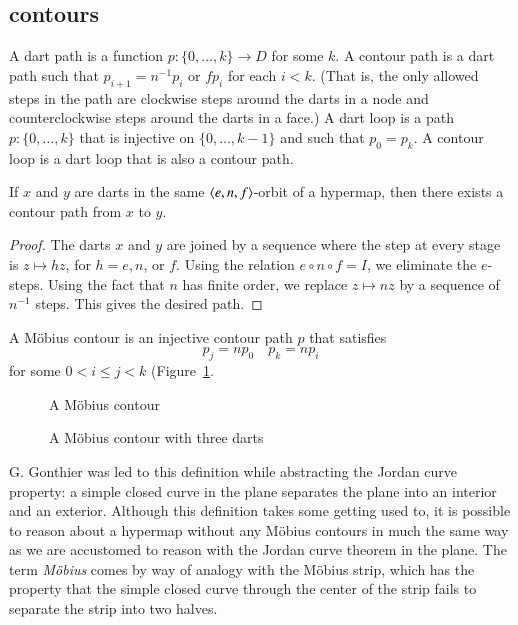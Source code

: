 \subsection{contours}

\begin{definition}  A dart path is a function $p:\{0,\ldots,k\}\to D$
for some $k$.  A contour path is a dart path such that $p_{i+1} =
n^{-1} p_i$ or $f p_i$ for each $i<k$.  (That is, the only allowed
steps in the path are clockwise steps around the darts in a node and
counterclockwise steps around the darts in a face.)  A dart loop is
a path $p:\{0,\ldots,k\}$ that is injective on $\{0,\ldots,k-1\}$
and such that $p_0 = p_k$.  A contour loop is a dart loop that is
also a contour path.
\end{definition}

\begin{lemma}\label{lemma:connect-contour}  If $x$ and $y$ are darts
in the same $\langle e,n,f\rangle$-orbit of a hypermap, then there exists
a contour path from $x$ to $y$.
\end{lemma}

\begin{proof} 
The darts
$x$ and $y$ are joined by a sequence where the step at every stage
is $z\mapsto h z$, for $h=e,n$, or $f$.  Using the relation $e\circ
n\circ f = I$, we eliminate the $e$-steps. Using the fact that $n$
has finite order, we replace $z \mapsto n z$ by a sequence
of $n^{-1}$ steps.  This gives the desired path.
\end{proof}

\begin{definition} A M\"obius contour is an
injective contour path $p$ that satisfies
    \begin{equation}
    \label{eqn:mobius}
    p_j = n p_0\quad p_k = n p_i
    \end{equation}
for some $0 < i\le j< k$ (Figure~\ref{fig:mobius}.
\end{definition}

\begin{figure}[htb]
  \centering
  \caption{A M\"obius contour}
  \label{fig:mobius}
\end{figure}

\begin{figure}[htb]
  \centering
  \caption{A M\"obius contour with three darts}
  \label{fig:3m}
\end{figure}


\begin{remark}
 G. Gonthier was led to
this definition while abstracting the Jordan curve property: a
simple closed curve in the plane separates the plane into an
interior and an exterior.  Although this definition takes some getting used to,
it is possible to reason about a hypermap without any M\"obius contours in
much the same way as we are accustomed to reason with the Jordan curve theorem
in the plane.
The term {\it M\"obius} comes by way of
analogy with the M\"obius strip, which has the property that the
simple closed curve through the center of the strip fails to
separate the strip into two halves.
\end{remark}



